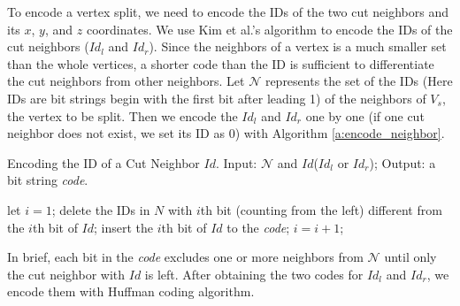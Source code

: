 	To encode a vertex split, we need to encode the IDs of the two
	cut neighbors and its $x$, $y$, and $z$ coordinates.
    We use Kim et al.'s algorithm \cite{multiresolution:kim}
    to encode the IDs of the cut neighbors ($Id_l$ and $Id_r$). 
    Since the neighbors of a vertex is a much smaller set 
    than the whole vertices, a shorter code than the ID is sufficient
    to differentiate the cut neighbors from other neighbors. 
    Let $\mathcal{N}$ represents the set of the IDs 
    (Here IDs are bit strings begin with the first bit after leading 1)
    of the neighbors of $V_s$, the vertex to be split. 
    Then we encode the $Id_l$ and $Id_r$ one by one 
    (if one cut neighbor does not exist, we set its ID as $0$)
    with Algorithm \ref{a:encode_neighbor}.
    \begin{algorithm}
    \caption{Encoding the ID of a Cut Neighbor $Id$. 
    Input: $\mathcal{N}$ and $Id$($Id_l$ or $Id_r$); Output: a bit string \emph{code}.
    \label{a:encode_neighbor}}
    \begin{algorithmic}
    \STATE let $i = 1$;
        \STATE delete the IDs in $N$ with $i$th bit (counting from the left) different from the $i$th bit of $Id$;
            \STATE insert the $i$th bit of $Id$ to the \emph{code};
        \ENDIF
        \STATE $i=i+1$;
    \ENDWHILE
    \end{algorithmic}
    \end{algorithm}

    In brief, each bit in the \emph{code} excludes one or more neighbors
    from $\mathcal{N}$ until only the cut neighbor with $Id$ is left. 
    After obtaining the two codes for $Id_l$ and $Id_r$, we encode them with Huffman coding algorithm.

